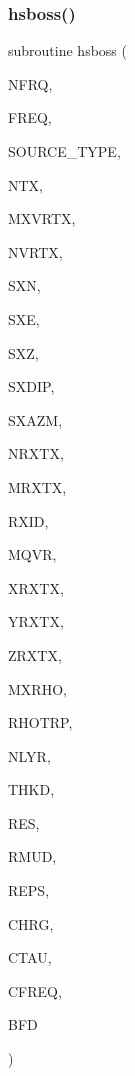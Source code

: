 \subsubsection{\texorpdfstring{hsboss()}{hsboss()}}
{\footnotesize\ttfamily subroutine hsboss (\begin{DoxyParamCaption}\item[{integer}]{N\+F\+RQ,  }\item[{real, dimension(nfrq)}]{F\+R\+EQ,  }\item[{integer}]{S\+O\+U\+R\+C\+E\+\_\+\+T\+Y\+PE,  }\item[{integer}]{N\+TX,  }\item[{integer}]{M\+X\+V\+R\+TX,  }\item[{integer, dimension(ntx)}]{N\+V\+R\+TX,  }\item[{real, dimension (mxvrtx,ntx)}]{S\+XN,  }\item[{real, dimension (mxvrtx,ntx)}]{S\+XE,  }\item[{real, dimension (ntx)}]{S\+XZ,  }\item[{real, dimension (ntx)}]{S\+X\+D\+IP,  }\item[{real, dimension (ntx)}]{S\+X\+A\+ZM,  }\item[{integer, dimension(ntx)}]{N\+R\+X\+TX,  }\item[{integer}]{M\+R\+X\+TX,  }\item[{integer, dimension(mrxtx,ntx)}]{R\+X\+ID,  }\item[{integer}]{M\+Q\+VR,  }\item[{real, dimension(mrxtx,ntx,mqvr)}]{X\+R\+X\+TX,  }\item[{real, dimension(mrxtx,ntx,mqvr)}]{Y\+R\+X\+TX,  }\item[{real, dimension(mrxtx,ntx)}]{Z\+R\+X\+TX,  }\item[{integer}]{M\+X\+R\+HO,  }\item[{real, dimension(mxrho)}]{R\+H\+O\+T\+RP,  }\item[{integer}]{N\+L\+YR,  }\item[{real(kind=ql), dimension(nlyr)}]{T\+H\+KD,  }\item[{real, dimension (nlyr)}]{R\+ES,  }\item[{real(kind=ql), dimension(0\+:nlyr)}]{R\+M\+UD,  }\item[{real, dimension (nlyr)}]{R\+E\+PS,  }\item[{real, dimension (nlyr)}]{C\+H\+RG,  }\item[{real, dimension (nlyr)}]{C\+T\+AU,  }\item[{real, dimension (nlyr)}]{C\+F\+R\+EQ,  }\item[{complex, dimension(nfrq,mrxtx,ntx,3)}]{B\+FD }\end{DoxyParamCaption})}


